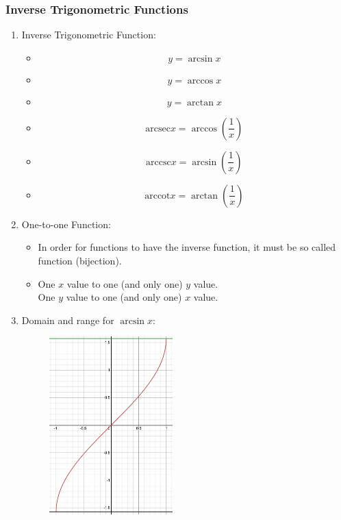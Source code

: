 \documentclass[12pt, a4paper]{article}
\begin{document}
\subsubsection{Inverse Trigonometric Functions}
\begin{enumerate}
  \item Inverse Trigonometric Function: 
  \begin{itemize}
    \item $$y=\arcsin{x}$$
    \item $$y=\arccos{x}$$
    \item $$y=\arctan{x}$$
    \item $$\text{arcsec}x=\arccos{\left(\frac{1}{x}\right)}$$
    \item $$\text{arccsc}x=\arcsin{\left(\frac{1}{x}\right)}$$
    \item $$\text{arccot}x=\arctan{\left(\frac{1}{x}\right)}$$
  \end{itemize}
  \item One-to-one Function: 
  \begin{itemize}
    \item In order for functions to have the inverse function, it must be so called \textbf{\color{red}{one-to-one}} function (bijection). 
    \item One $x$ value to one (and only one) $y$ value.\\
    One $y$ value to one (and only one) $x$ value. 
  \end{itemize}
  \item Domain and range for $\arcsin{x}$: 
  \begin{itemize}
    \begin{figure}[H]
      \centering
      \includegraphics[width=0.45\textwidth]{Fig.3.31.jpg}

\end{figure}
\end{itemize}
\end{enumerate}
\end{document}
